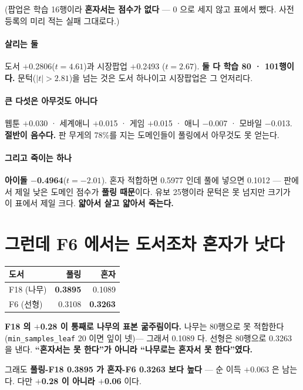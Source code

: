 \documentclass[10pt]{article}
\begin{document}
(팝업은 학습 16행이라 \textbf{혼자서는 점수가 없다} --- 0 으로 세지 않고
표에서 뺐다. 사전 등록의 미리 적는 실패 그대로다.)

\paragraph{살리는 둘} 도서 $+$0.2806($t{=}4.61$)과 시장팝업 $+$0.2493
($t{=}2.67$). \textbf{둘 다 학습 80 · 101행이다.} 문턱($|t|{>}2.81$)을 넘는
것은 도서 하나이고 시장팝업은 그 언저리다.

\paragraph{큰 다섯은 아무것도 아니다} 웹툰 $+$0.030 · 세계애니 $+$0.015 ·
게임 $+$0.015 · 애니 $-$0.007 · 모바일 $-$0.013. \textbf{절반이 음수다.}
판 무게의 78\%를 지는 도메인들이 풀링에서 아무것도 못 얻는다.

\paragraph{그리고 죽이는 하나} \textbf{아이돌 $-$0.4964}($t{=}{-}2.01$).
혼자 적합하면 0.5977 인데 풀에 넣으면 0.1012 --- 판에서 제일 낮은 도메인
점수가 \textbf{풀링 때문}이다. 유보 25행이라 문턱은 못 넘지만 크기가
이 표에서 제일 크다. \textbf{얇아서 살고 얇아서 죽는다.}

\section{그런데 F6 에서는 도서조차 혼자가 낫다}

\begin{center}\small
\begin{tabular}{lrr}
\hline
도서 & 풀링 & 혼자 \\
\hline
F18 (나무) & \textbf{0.3895} & 0.1089 \\
F6 (선형) & 0.3108 & \textbf{0.3263} \\
\hline
\end{tabular}
\end{center}

\textbf{F18 의 $+$0.28 이 통째로 나무의 표본 굶주림이다.} 나무는 80행으로
못 적합한다(\texttt{min\_samples\_leaf} 20 이면 잎이 넷)--- 그래서 0.1089 다.
선형은 80행으로 0.3263 을 낸다. \textbf{``혼자서는 못 한다''가 아니라
``나무로는 혼자서 못 한다''였다.}

그래도 \textbf{풀링-F18 0.3895 가 혼자-F6 0.3263 보다 높다} --- 순 이득
$+$0.063 은 남는다. 다만 \textbf{$+$0.28 이 아니라 $+$0.06} 이다.
\end{document}
